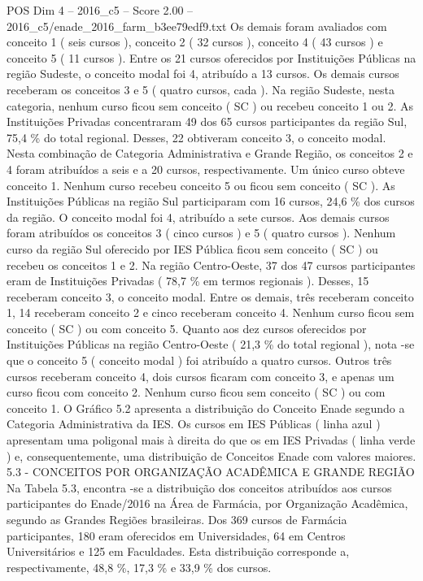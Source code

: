 \begin{textsample}{POS Dim 4 – 2016\_c5 – Score 2.00 – 2016\_c5/enade\_2016\_farm\_b3ee79edf9.txt}
Os demais foram avaliados com conceito 1 ( seis cursos ), conceito 2 ( 32 cursos ), conceito 4 ( 43 cursos ) e conceito 5 ( 11 cursos ).
Entre os 21 cursos oferecidos por Instituições Públicas na região Sudeste, o conceito modal foi 4, atribuído a 13 cursos.
Os demais cursos receberam os conceitos 3 e 5 ( quatro cursos, cada ).
Na região Sudeste, nesta categoria, nenhum curso ficou sem conceito ( SC ) ou recebeu conceito 1 ou 2.
As Instituições Privadas concentraram 49 dos 65 cursos participantes da região Sul, 75,4 \% do total regional.
Desses, 22 obtiveram conceito 3, o conceito modal.
Nesta combinação de Categoria Administrativa e Grande Região, os conceitos 2 e 4 foram atribuídos a seis e a 20 cursos, respectivamente.
Um único curso obteve conceito 1.
Nenhum curso recebeu conceito 5 ou ficou sem conceito ( SC ).
As Instituições Públicas na região Sul participaram com 16 cursos, 24,6 \% dos cursos da região.
O conceito modal foi 4, atribuído a sete cursos.
Aos demais cursos foram atribuídos os conceitos 3 ( cinco cursos ) e 5 ( quatro cursos ).
Nenhum curso da região Sul oferecido por IES Pública ficou sem conceito ( SC ) ou recebeu os conceitos 1 e 2.
Na região Centro-Oeste, 37 dos 47 cursos participantes eram de Instituições Privadas ( 78,7 \% em termos regionais ).
Desses, 15 receberam conceito 3, o conceito modal.
Entre os demais, três receberam conceito 1, 14 receberam conceito 2 e cinco receberam conceito 4.
Nenhum curso ficou sem conceito ( SC ) ou com conceito 5.
Quanto aos dez cursos oferecidos por Instituições Públicas na região Centro-Oeste ( 21,3 \% do total regional ), nota -se que o conceito 5 ( conceito modal ) foi atribuído a quatro cursos.
Outros três cursos receberam conceito 4, dois cursos ficaram com conceito 3, e apenas um curso ficou com conceito 2.
Nenhum curso ficou sem conceito ( SC ) ou com conceito 1.
O Gráfico 5.2 apresenta a distribuição do Conceito Enade segundo a Categoria Administrativa da IES.
Os cursos em IES Públicas ( linha azul ) apresentam uma poligonal mais à direita do que os em IES Privadas ( linha verde ) e, consequentemente, uma distribuição de Conceitos Enade com valores maiores. 5.3 - CONCEITOS POR ORGANIZAÇÃO ACADÊMICA E GRANDE REGIÃO Na Tabela 5.3, encontra -se a distribuição dos conceitos atribuídos aos cursos participantes do Enade/2016 na Área de Farmácia, por Organização Acadêmica, segundo as Grandes Regiões brasileiras.
Dos 369 cursos de Farmácia participantes, 180 eram oferecidos em Universidades, 64 em Centros Universitários e 125 em Faculdades.
Esta distribuição corresponde a, respectivamente, 48,8 \%, 17,3 \% e 33,9 \% dos cursos.

\end{textsample}
